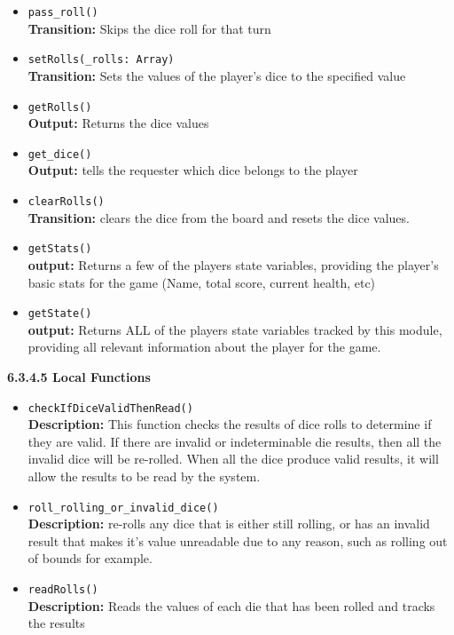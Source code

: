 \documentclass[12pt, titlepage]{article}
\begin{document}
\begin{itemize}
    \item \texttt{pass\_roll()}\\
    \textbf{Transition:} Skips the dice roll for that turn
    
    \item \texttt{setRolls(\_rolls: Array)}\\
	\textbf{Transition:} Sets the values of the player's dice to the specified value
    
    \item \texttt{getRolls()}\\
    	\textbf{Output:} Returns the dice values 
    
    \item \texttt{get\_dice()}\\
    	\textbf{Output:} tells the requester which dice belongs to the player
    	
    \item \texttt{clearRolls()}\\
    	\textbf{Transition:} clears the dice from the board and resets the dice values.
    	
    \item \texttt{getStats()}\\
    	\textbf{output:} Returns a few of the players state variables, providing the player's basic stats for the game (Name, total score, current health, etc)
    	
    \item \texttt{getState()}\\
    	\textbf{output:} Returns ALL of the players state variables tracked by this module, providing all relevant information about the player for the game.

\end{itemize}

\textbf{6.3.4.5 Local Functions}
\begin{itemize}
    
    \item \texttt{checkIfDiceValidThenRead()}\\
    \textbf{Description:} This function checks the results of dice rolls to determine if they are valid. If there are invalid or indeterminable die results, then all the invalid dice will be re-rolled. When all the dice produce valid results, it will allow the results to be read by the system.
    
    \item \texttt{roll\_rolling\_or\_invalid\_dice()}\\
    	\textbf{Description:} re-rolls any dice that is either still rolling, or has an invalid result that makes it's value unreadable due to any reason, such as rolling out of bounds for example.    
    
    \item \texttt{readRolls()}\\
    \textbf{Description:} Reads the values of each die that has been rolled and tracks the results
    
\end{itemize}
\end{document}
